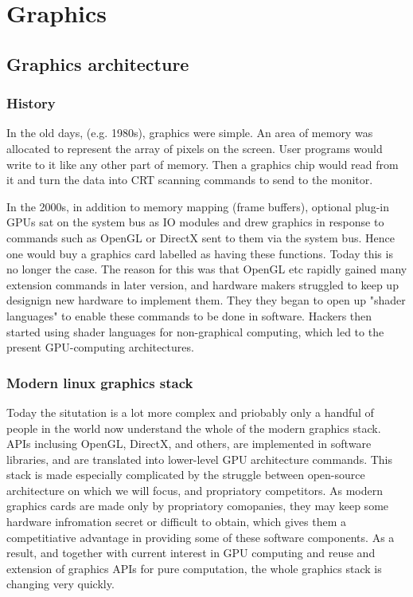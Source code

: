 \documentclass[oneside,english]{scrbook}
\begin{document}
\part{Graphics}


\chapter{Graphics architecture}

\section{History}

In the old days, (e.g. 1980s), graphics were simple.  An area of memory was allocated to represent the array of pixels on the screen. User programs would write to it like any other part of memory. Then a graphics chip would read from it and turn the data into CRT scanning commands to send to the monitor.

In the 2000s, in addition to memory mapping (frame buffers), optional plug-in GPUs sat on the system bus as IO modules and drew graphics in response to commands such as OpenGL or DirectX sent to them via the system bus. Hence one would buy a graphics card labelled as having these functions.   Today this is no longer the case.  The reason for this was that OpenGL etc rapidly gained many extension commands in later version, and hardware makers struggled to keep up designign new hardware to implement them. They they began to open up "shader languages" to enable these commands to be done in software.  Hackers then started using shader languages for non-graphical computing, which led to the present GPU-computing architectures.

\section{Modern linux graphics stack}


Today the situtation is a lot more complex and priobably only a handful of people in the world now understand the whole of the modern graphics stack. APIs inclusing OpenGL, DirectX, and others, are implemented in software libraries, and are translated into lower-level GPU architecture commands.   This stack is made especially complicated by the struggle between open-source architecture on which we will focus, and propriatory competitors.  As modern graphics cards are made only by propriatory comopanies, they may keep some hardware infromation secret or difficult to obtain, which gives them a competitiative advantage in providing some of these software components.  As a result, and together with current interest in GPU computing and reuse and extension of graphics APIs for pure computation, the whole graphics stack is changing very quickly.
\end{document}
